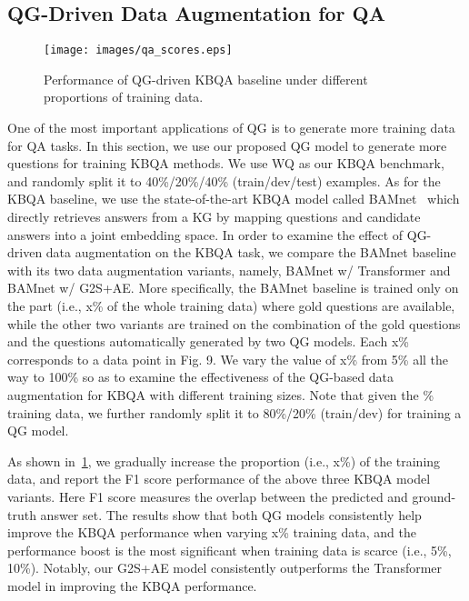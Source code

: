 \documentclass[journal]{IEEEtran}
\begin{document}
\subsection{QG-Driven Data Augmentation for QA}

\begin{figure}[!htb]
\vspace{-1mm}
  \centering
    \texttt{[image: images/qa\_scores.eps]}
  \caption{Performance of QG-driven KBQA baseline under different proportions of training data.}
  \label{fig:qa_results}
  \vspace{-3mm}
\end{figure}


One of the most important applications of QG is to generate more training data for QA tasks. 
In this section, we use our proposed QG model to generate more questions for training KBQA methods.
We use WQ as our KBQA benchmark, and randomly split it to 40\%/20\%/40\% (train/dev/test) examples.
As for the KBQA baseline, we use the state-of-the-art KBQA model called BAMnet~\cite{chen2019bidirectional} which directly retrieves answers from a KG by mapping questions and candidate answers into a joint embedding space.
In order to examine the effect of QG-driven data augmentation on the KBQA task, 
we compare the BAMnet baseline with its two data augmentation variants, namely, BAMnet w/ Transformer and BAMnet w/ G2S+AE.
More specifically, the BAMnet baseline is trained only on the part 
(i.e., x\% of the whole training data) 
where gold questions are available, while the other two variants are trained on the combination of the gold questions and the questions automatically generated by two QG models.
Each x\% corresponds to a data point in Fig. 9. We vary the value of x\% from 5\% all the way to 100\% so as to examine the effectiveness of the QG-based data augmentation for KBQA with different training sizes.
Note that given the \% training data, we further randomly split it to 80\%/20\% (train/dev) for training a QG model.



As shown in~\cref{fig:qa_results}, we gradually increase the proportion (i.e., x\%) of the training data, and report the F1 score performance of the above three KBQA model variants.
Here F1 score measures the overlap between the predicted and ground-truth answer set.
The results show that both QG models consistently help improve the KBQA performance when varying x\% training data, and the performance boost is the most significant when training data is scarce (i.e., 5\%, 10\%).
Notably, our G2S+AE model consistently outperforms the Transformer model in improving the KBQA performance. 
\end{document}
